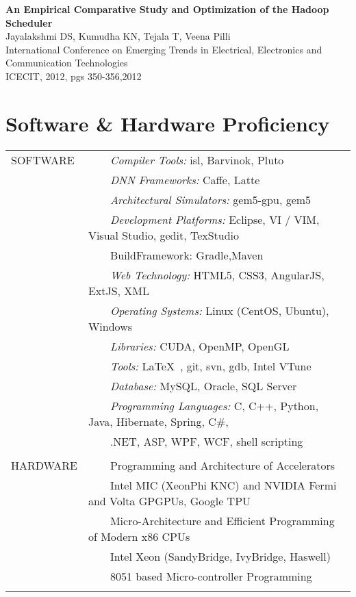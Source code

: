 \documentclass[a4paper,10pt]{article} %
\newcommand{\tabitem}{~~\llap{\textbullet}~~}
\begin{document}
\textbf{An Empirical Comparative Study and Optimization of the Hadoop Scheduler} \\
\small{Jayalakshmi DS, Kumudha KN, Tejala T, Veena Pilli}\\
\small{International Conference on Emerging Trends in Electrical, Electronics and 
Communication Technologies \\ ICECIT, 2012, pgs 350-356,2012}
\\
\newpage

\section{Software \& Hardware Proficiency}
\begin{tabular}{p{3cm}l}
SOFTWARE & \tabitem \textit{Compiler Tools:} isl, Barvinok, Pluto\\
& \tabitem \textit{DNN Frameworks:} Caffe, Latte\\
& \tabitem \textit{Architectural Simulators:} gem5-gpu, gem5\\
& \tabitem \textit{Development Platforms:} Eclipse, VI / VIM, Visual Studio, gedit, TexStudio\\
& \tabitem{BuildFramework:} Gradle,Maven \\
& \tabitem \textit{Web Technology:} HTML5, CSS3, AngularJS, ExtJS, XML\\
& \tabitem \textit{Operating Systems:} Linux (CentOS, Ubuntu), Windows \\
& \tabitem \textit{Libraries:} CUDA, OpenMP, OpenGL  \\
& \tabitem \textit{Tools:} \LaTeX\ , git, svn, gdb, Intel VTune\\
& \tabitem \textit{Database:} MySQL, Oracle, SQL Server\\
& \tabitem \textit{Programming Languages:} C, C++, Python, Java, Hibernate, Spring, C\#, \\
& ~~~~.NET, ASP, WPF, WCF, shell scripting\\

&\\

HARDWARE  & \tabitem Programming and Architecture of Accelerators \\
& ~~~~Intel MIC (XeonPhi KNC) and NVIDIA Fermi and Volta GPGPUs, Google TPU \\
& \tabitem Micro-Architecture and Efficient Programming of Modern x86 CPUs\\
& ~~~~Intel Xeon (SandyBridge, IvyBridge, Haswell) \\ 
& \tabitem 8051 based Micro-controller Programming \\
&\\
\end{tabular}
\\
\\
\end{document}

